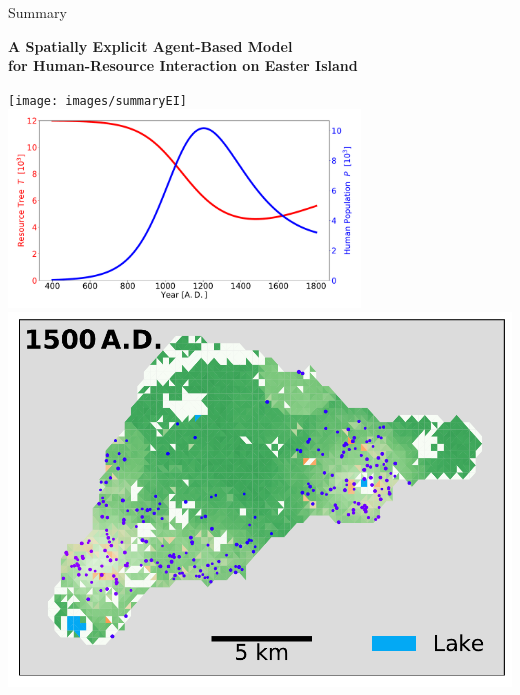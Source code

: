 \documentclass[aspectratio=1610]{beamer}
\begin{document}
\begin{frame}[noframenumbering]{Summary}
\begin{Large}\begin{center}
		\textbf{A Spatially Explicit Agent-Based Model \\ for Human-Resource Interaction on Easter Island}
\end{center}\end{Large}
\begin{minipage}[t][0.66\textheight][t]{0.6\textwidth}
	\vspace{0pt}
	\tableofcontents
\end{minipage}
\begin{minipage}[t][0.7\textheight][t]{0.35\textwidth}
	\vspace{0pt}
		\texttt{[image: images/summaryEI]}
	\includegraphics[width=0.7\textwidth]{../../Thesis/images/Brander1998_EIBaseCase_presentation}
	\includegraphics[width=0.8\linewidth]{images/map_time1500}
\end{minipage}

\end{frame}
\end{document}
